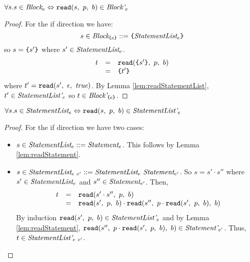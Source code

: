 \documentclass[preprint,10pt]{sigplanconf}
\begin{document}
\begin{lemma}\mbox{}
  
  \( \forall s. s \in \textit{Block}_{e} \Leftrightarrow 
  \texttt{read}(s,~p,~b) \in \textit{Block'}_{e} \)
\end{lemma}
\begin{proof}
  For the if direction we have:
  \[ 
  s \in \textit{Block}_{\texttt{\{}e\texttt{\}}} ::= \texttt{\{}\textit{StatementList}_{e}\texttt{\}}
  \]
  so \( s = \texttt{\{}s'\texttt{\}} \) where \( s' \in \textit{StatementList}_{e} \).
  \[
  \begin{array}{rcl}
    t &=& \texttt{read}(\texttt{\{}s'\texttt{\}},~p,~b)
    \\
    &=& \texttt{\{}t'\texttt{\}}
  \end{array}
  \]
  where \( t' = \texttt{read}(s',~\epsilon,~\textit{true}) \). By Lemma
  \ref{lem:readStatementList}, \( t' \in \textit{StatementList'}_{e} \)
  so \( t \in \textit{Block'}_{\texttt{\{}e\texttt{\}}} \).
\end{proof}

\begin{lemma}\mbox{}

  \( \forall s. s \in \textit{StatementList}_{e} \Leftrightarrow 
  \texttt{read}(s,~p,~b) \in \textit{StatementList'}_{e} \)
\end{lemma}
\begin{proof}
  For the if direction we have two cases:
  \begin{itemize}
  \item \( s \in \textit{StatementList}_{e} ::= \textit{Statement}_{e} \).
    This follows by Lemma \ref{lem:readStatement}.

  \item \( s \in \textit{StatementList}_{e~e'} ::=
    \textit{StatementList}_{e}~ \textit{Statement}_{e'} \). So 
    \( s = s' \cdot s'' \) where \( s' \in \textit{StatementList}_{e} \)
    and \( s'' \in \textit{Statement}_{e'} \). Then,
    \[
    \begin{array}{rcl}
      t &=& \texttt{read}(s' \cdot s'',~p,~b)
      \\
      &=& \texttt{read}(s',~p,~b) \cdot \texttt{read}(s'',~p \cdot \texttt{read}(s',~p,~b),~b)
    \end{array}
    \]
    By induction \( \texttt{read}(s',~p,~b) \in \textit{StatementList'}_{e} \)
    and by Lemma \ref{lem:readStatement}, \( \texttt{read}(s'',~p \cdot
      \texttt{read}(s',~p,~b),~b) \in \textit{Statement'}_{e'} \).
    Thus, \( t \in \textit{StatementList'}_{e~e'} \).
  \end{itemize}
\end{proof}
\end{document}
